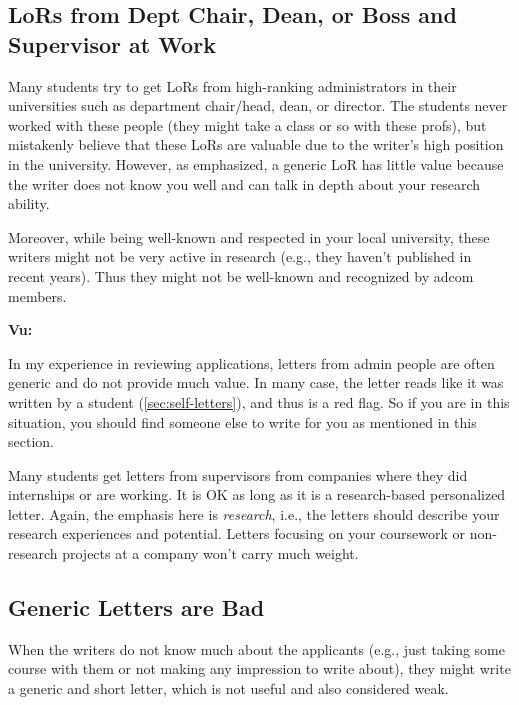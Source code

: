 \documentclass[oneside,11pt,dvipsnames]{book}
\newenvironment{commentbox}[1][]{
  \small
  \begin{mybox}
    {\small \textbf{#1}}
  }{
  \end{mybox}
}
\begin{document}
  \subsection{LoRs from Dept Chair, Dean, or Boss and Supervisor at Work}\label{sec:admin-letters}

  Many students try to get LoRs from high-ranking administrators in their universities such as department chair/head, dean, or director. The students never worked with these people (they might take a class or so with these profs), but mistakenly believe that these LoRs are valuable due to the writer's high position in the university.
  However, as emphasized, a generic LoR has little value because the writer does not know you well and can talk in depth about your research ability. 
  
  Moreover, while being well-known and respected in your local university, these writers might not be very active in research (e.g., they haven't published in recent years). Thus they might not be well-known and recognized by adcom members.  
  
  \begin{commentbox}[Vu:]
    In my experience in reviewing applications, letters from admin people are often generic and do not provide much value. 
    In many case, the letter reads like it was written by a student (\autoref{sec:self-letters}), and thus is a red flag.  So if you are in this situation, you should find someone else to write for you as mentioned in this section.
  \end{commentbox}
  
  Many students get letters from supervisors from companies where they did internships or are working.  It is OK as long as it is a research-based personalized letter. Again, the emphasis here is \emph{research}, i.e., the letters should describe your research experiences and potential. Letters focusing on your coursework or non-research projects at a company won't carry much weight.


  
\subsection{Generic Letters are Bad}\label{sec:generic-letters} 
When the writers do not know much about the applicants (e.g., just taking some course with them or not making any impression to write about), they might write a generic and short letter, which is not useful and also considered weak. 
\end{document}
